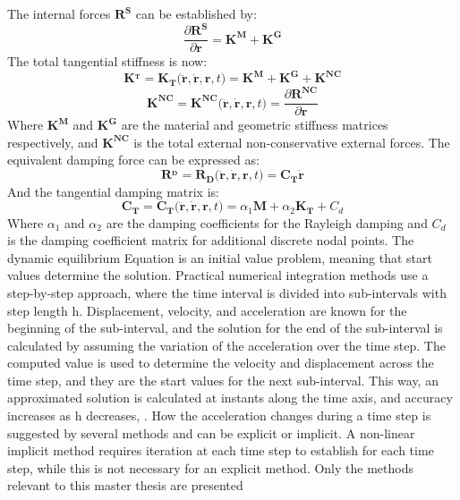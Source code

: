 \noindent The internal forces $\boldsymbol{R^S}$ can be established by:
\begin{equation}
    \frac{\partial \boldsymbol{R^S} }{\partial\boldsymbol{r}}= \boldsymbol{K^M}+\boldsymbol{K^G}
\end{equation}
\noindent The total tangential stiffness is now:
\begin{equation}
    \boldsymbol{K^_T}=\boldsymbol{K_T(\ddot{r},\dot{r},r},t)=\boldsymbol{K^M}+\boldsymbol{K^G}+\boldsymbol{K^{NC}}
\end{equation}
\begin{equation}
    \boldsymbol{K^{NC}}=\boldsymbol{K^{NC}(\ddot{r},\dot{r},r},t)=  \frac{\partial \boldsymbol{R^{NC}} }{\partial\boldsymbol{r}}
\end{equation}
\noindent Where $\boldsymbol{K^M}$ and $\boldsymbol{K^G}$ are the material and geometric stiffness matrices respectively, and $\boldsymbol{K^{NC}}$ is the total external non-conservative external forces. \newline
\newline
The equivalent damping force can be expressed as:
\begin{equation}
    \boldsymbol{R^_D}=\boldsymbol{R_D(\ddot{r},\dot{r},r},t)=  \boldsymbol{C_T}\boldsymbol{\dot{r}}
\end{equation}
And the tangential damping matrix is:
\begin{equation}
      \boldsymbol{C_{T}}=\boldsymbol{C_T(\ddot{r},\dot{r},r,}t)=\alpha_1 \boldsymbol{M}+\alpha_2\boldsymbol{K_T} + C_d 
\end{equation}
Where $\alpha_1$ and $\alpha_2$ are the damping coefficients for the Rayleigh damping and $C_d$ is the damping coefficient matrix for additional discrete nodal points.  
\newline
\newline 
\noindent  The dynamic equilibrium Equation is an initial value problem, meaning that start values determine the solution. Practical numerical integration methods use a step-by-step approach, where the time interval is divided into sub-intervals with step length h. Displacement, velocity, and acceleration are known for the beginning of the sub-interval, and the solution for the end of the sub-interval is calculated by assuming the variation of the acceleration over the time step. The computed value is used to determine the velocity and displacement across the time step, and they are the start values for the next sub-interval. This way, an approximated solution is calculated at instants along the time axis, and accuracy increases as h decreases, \cite{Langen1999}.
\newline 
\newline
 \noindent How the acceleration changes during a time step is suggested by several methods and can be explicit or implicit. A non-linear implicit method requires iteration at each time step to establish for each time step, while this is not necessary for an explicit method. Only the methods relevant to this master thesis are presented\newline
 \newline
\noindent 
